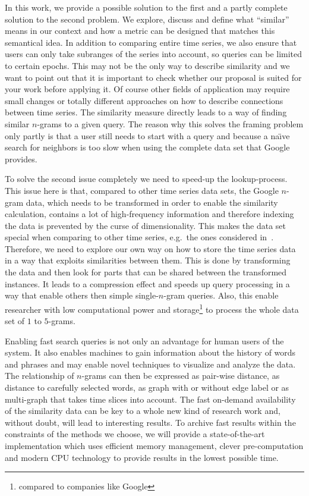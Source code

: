 In this work, we provide a possible solution to the first and a partly complete solution to the second problem. We explore, discuss and define what \enquote{similar} means in our context and how a metric can be designed that matches this semantical idea. In addition to comparing entire time series, we also ensure that users can only take subranges of the series into account, so queries can be limited to certain epochs. This may not be the only way to describe similarity and we want to point out that it is important to check whether our proposal is suited for your work before applying it. Of course other fields of application may require small changes or totally different approaches on how to describe connections between time series. The similarity measure directly leads to a way of finding similar $n$-grams to a given query. The reason why this solves the framing problem only partly is that a user still needs to start with a query and because a na{\"\i}ve search for neighbors is too slow when using the complete data set that Google provides.

To solve the second issue completely we need to speed-up the lookup-process. This issue here is that, compared to other time series data sets, the Google $n$-gram data, which needs to be transformed in order to enable the similarity calculation, contains a lot of high-frequency information and therefore indexing the data is prevented by the curse of dimensionality. This makes the data set special when comparing to other time series, e.g.\ the ones considered in~\cite{LB_Keogh}. Therefore, we need to explore our own way on how to store the time series data in a way that exploits similarities between them. This is done by transforming the data and then look for parts that can be shared between the transformed instances. It leads to a compression effect and speeds up query processing in a way that enable others then simple single-$n$-gram queries. Also, this enable researcher with low computational power and storage\footnote{compared to companies like Google} to process the whole data set of $1$ to $5$-grams.

Enabling fast search queries is not only an advantage for human users of the system. It also enables machines to gain information about the history of words and phrases and may enable novel techniques to visualize and analyze the data. The relationship of $n$-grams can then be expressed as pair-wise distance, as distance to carefully selected words, as graph with or without edge label or as multi-graph that takes time slices into account. The fast on-demand availability of the similarity data can be key to a whole new kind of research work and, without doubt, will lead to interesting results. To archive fast results within the constraints of the methods we choose, we will provide a state-of-the-art implementation which uses efficient memory management, clever pre-computation and modern CPU technology to provide results in the lowest possible time.

